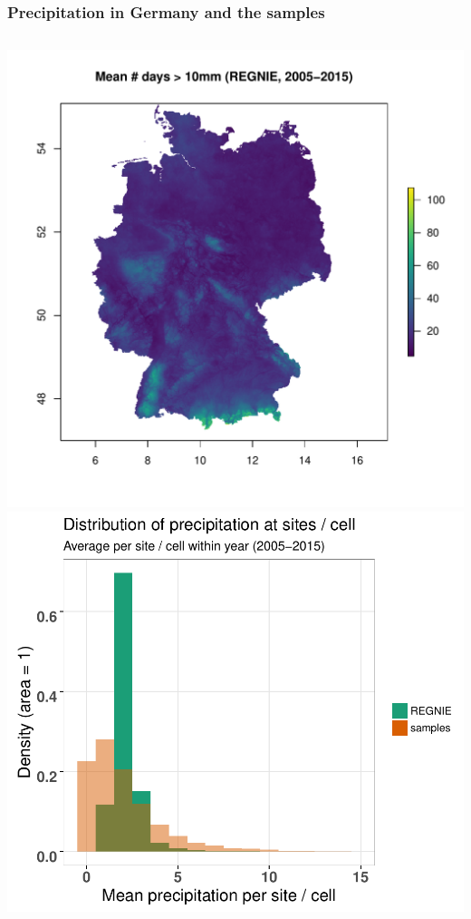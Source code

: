 \documentclass[
	12pt
	]{beamer}
\begin{document}
\begin{frame}
\frametitle{Precipitation in Germany and the samples}
	\begin{columns}
	    	\includegraphics[width=1.1\textwidth, keepaspectratio]{figs/precip_map.pdf}
	    	    	\includegraphics[width=1.1\textwidth, keepaspectratio]{figs/precip_comp.pdf}
	\end{columns}
\end{frame}
\end{document}
